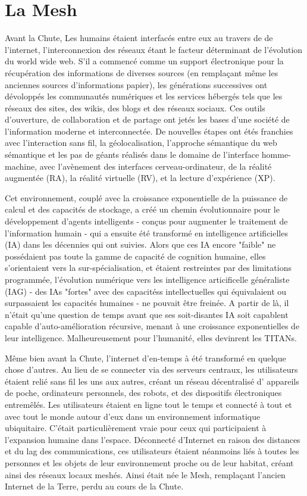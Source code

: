 \chapter{La Mesh} \label{cha:mesh} 

Avant la Chute, Les humains étaient interfacés entre eux au travers de de l'internet, l'interconnexion des réseaux étant le facteur déterminant de l'évolution du world wide web. S'il a commencé comme un support électronique pour la récupération des informations de diverses sources (en remplaçant même les anciennes sources d'informations papier), les générations successives ont dévoloppés les communautés numériques et les services hébergés tels que les réseaux des sites, des wikis, des blogs et des réseaux sociaux. Ces outils d'ouverture, de collaboration et de partage ont jetés les bases d'une société de l'information moderne et interconnectée. De nouvelles étapes ont étés franchies avec l'interaction sans fil, la géolocalisation, l'approche sémantique du web sémantique et les pas de géants réalisés dans le domaine de l'interface homme-machine, avec l'avènement des interfaces cerveau-ordinateur, de la réalité augmentée (RA), la réalité virtuelle (RV), et la lecture d'expérience (XP). 

Cet environnement, couplé avec la croissance exponentielle de la puissance de calcul et des capacités de stockage, a créé un chemin évolutionnaire pour le développement d'agents intelligents - conçus pour augmenter le traitement de l'information humain - qui a ensuite été transformé en intelligence artificielles (IA) dans les décennies qui ont suivies. Alors que ces IA encore "faible" ne possédaient pas toute la gamme de capacité de cognition humaine, elles s'orientaient vers la sur-spécialisation, et étaient restreintes par des limitations programmée, l'évolution numérique vers les intelligence articificelle généraliste (IAG) - des IAs "fortes" avec des capacitéss intellectuelles qui équivalaient ou surpassaient les capacités humaines - ne pouvait être freinée. A partir de là, il n'était qu'une question de temps avant que ses soit-disantes IA soit capablent capable d'auto-amélioration récursive, menant à une croissance exponentielles de leur intelligence. Malheureusement pour l'humanité, elles devinrent les TITANs. 

Même bien avant la Chute, l'internet d'en-temps à été transformé en quelque chose d'autres. Au lieu de se connecter via des serveurs centraux, les utilisateurs étaient relié sans fil les uns aux autres, créant un réseau décentralisé d' appareils de poche, ordinateurs personnels, des robots, et des dispositifs électroniques entremêlés. Les utilisateurs étaient en ligne tout le temps et connecté à tout et avec tout le monde autour d'eux dans un environnement informatique ubiquitaire. C'était particulièrement vraie pour ceux qui participaient à l'expansion humaine dans l'espace. Déconnecté d'Internet en raison des distances et du lag des communications, ces utilisateurs étaient néanmoins liés à toutes les personnes et les objets de leur environnement proche ou de leur habitat, créant ainsi des réseaux locaux meshés. Ainsi était née le Mesh, remplaçant l'ancien Internet de la Terre, perdu au cours de la Chute. 

